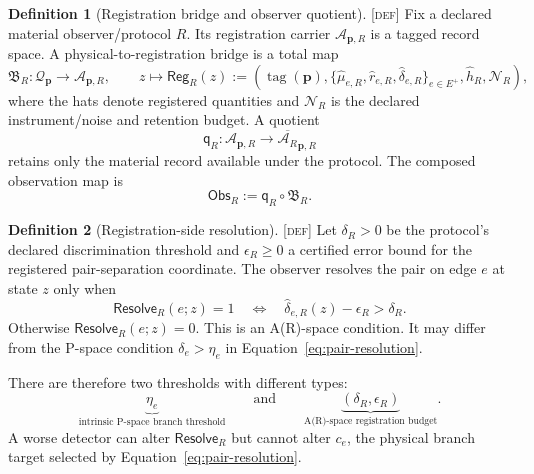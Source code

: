 \documentclass[11pt]{article}
\newcommand{\ARspace}{\ensuremath{\mathcal A_R}}
\newcommand{\State}{\ensuremath{\mathcal Q}}
\newcommand{\Reg}{\ensuremath{\mathsf{Reg}}}
\newcommand{\Obs}{\ensuremath{\mathsf{Obs}}}
\newcommand{\Bridge}{\ensuremath{\mathfrak B}}
\newcommand{\Quot}{\ensuremath{\mathsf q}}
\newcommand{\Resolve}{\ensuremath{\mathsf{Resolve}}}
\newcommand{\Defn}{\textsc{[def]}}
\theoremstyle{definition}
\newtheorem{definition}{Definition}[section]
\begin{document}
\begin{definition}[Registration bridge and observer quotient]
\label{def:bridge}
\Defn{} Fix a declared material observer/protocol $R$.  Its registration carrier
$\mathcal A_{\mathbf p,R}$ is a tagged record space.  A physical-to-registration
bridge is a total map
\begin{equation}
\Bridge_R:\State_{\mathbf p}\longrightarrow\mathcal A_{\mathbf p,R},
\qquad
z\longmapsto
\Reg_R(z):=\left(
\operatorname{tag}(\mathbf p),
\{\widehat\mu_{e,R},\widehat r_{e,R},\widehat\delta_{e,R}\}_{e\in E^+},
\widehat h_R,\mathcal N_R
\right),
\label{eq:bridge}
\end{equation}
where the hats denote registered quantities and $\mathcal N_R$ is the declared
instrument/noise and retention budget.  A quotient
\begin{equation}
\Quot_R:\mathcal A_{\mathbf p,R}\longrightarrow\overline{\ARspace}_{\mathbf p,R}
\label{eq:quotient}
\end{equation}
retains only the material record available under the protocol.  The composed
observation map is
\begin{equation}
\Obs_R:=\Quot_R\circ\Bridge_R.
\label{eq:observation-map}
\end{equation}
\end{definition}

\begin{definition}[Registration-side resolution]
\label{def:registration-resolution}
\Defn{} Let $\delta_R>0$ be the protocol's declared discrimination threshold and
$\epsilon_R\ge0$ a certified error bound for the registered pair-separation
coordinate.  The observer resolves the pair on edge $e$ at state $z$ only when
\begin{equation}
\Resolve_R(e;z)=1
\quad\Longleftrightarrow\quad
\widehat\delta_{e,R}(z)-\epsilon_R>\delta_R.
\label{eq:registration-resolution}
\end{equation}
Otherwise $\Resolve_R(e;z)=0$.  This is an A(R)-space condition.  It may differ
from the P-space condition $\delta_e>\eta_e$ in
Equation~\eqref{eq:pair-resolution}.
\end{definition}

There are therefore two thresholds with different types:
\begin{equation}
\underbrace{\eta_e}_{\text{intrinsic P-space branch threshold}}
\qquad\text{and}\qquad
\underbrace{(\delta_R,\epsilon_R)}_{\text{A(R)-space registration budget}}.
\label{eq:two-thresholds}
\end{equation}
A worse detector can alter $\Resolve_R$ but cannot alter $c_e$, the physical
branch target selected by Equation~\eqref{eq:pair-resolution}.
\end{document}
